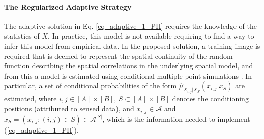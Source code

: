 
\paragraph{The Regularized Adaptive Strategy} 

The adaptive solution in  Eq. \eqref{eq_adaptive_1_PII} requires the knowledge of the statistics of $X$. In practice, this model is not available requiring to find a way to infer this model from empirical data. In the proposed solution, a training image is required that is deemed to represent the spatial continuity of the random function describing the spatial correlations in the underlying spatial model, and from this a model is estimated using conditional multiple point simulations \citep{Mariethoz_2014_a,Ortiz_2004_a}. In particular, a set of conditional probabilities  of the form $\hat{\mu}_{X_{i,j}| X_S}(x_{i,j}|x_S )$ are estimated,  where ${i,j}\in [A]\times [B]$,  $S\subset [A]\times [B]$ denotes the conditioning positions (attributed to sensed data),  and $x_{i,j}\in \mathcal{A}$ and $ x_S =(x_{i,j}:(i,j)\in S)\in \mathcal{A}^{\left|S \right|}$, which is the information needed to implement (\ref{eq_adaptive_1_PII}).


